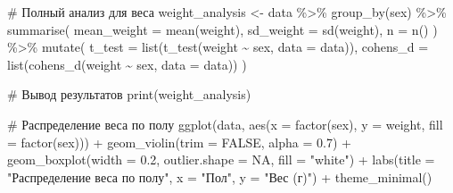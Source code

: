 \documentclass[
  letterpaper,
  DIV=11,
  numbers=noendperiod]{scrreprt}
\newenvironment{Shaded}{\begin{snugshade}}{\end{snugshade}}
\newcommand{\AttributeTok}[1]{\textcolor[rgb]{0.40,0.45,0.13}{#1}}
\newcommand{\CommentTok}[1]{\textcolor[rgb]{0.37,0.37,0.37}{#1}}
\newcommand{\ConstantTok}[1]{\textcolor[rgb]{0.56,0.35,0.01}{#1}}
\newcommand{\FloatTok}[1]{\textcolor[rgb]{0.68,0.00,0.00}{#1}}
\newcommand{\FunctionTok}[1]{\textcolor[rgb]{0.28,0.35,0.67}{#1}}
\newcommand{\NormalTok}[1]{\textcolor[rgb]{0.00,0.23,0.31}{#1}}
\newcommand{\OtherTok}[1]{\textcolor[rgb]{0.00,0.23,0.31}{#1}}
\newcommand{\SpecialCharTok}[1]{\textcolor[rgb]{0.37,0.37,0.37}{#1}}
\newcommand{\StringTok}[1]{\textcolor[rgb]{0.13,0.47,0.30}{#1}}
\begin{document}
\begin{Shaded}
\begin{Highlighting}[]
\CommentTok{\# Полный анализ для веса  }
\NormalTok{weight\_analysis }\OtherTok{\textless{}{-}}\NormalTok{ data }\SpecialCharTok{\%\textgreater{}\%}  
  \FunctionTok{group\_by}\NormalTok{(sex) }\SpecialCharTok{\%\textgreater{}\%}  
  \FunctionTok{summarise}\NormalTok{(  }
    \AttributeTok{mean\_weight =} \FunctionTok{mean}\NormalTok{(weight),  }
    \AttributeTok{sd\_weight =} \FunctionTok{sd}\NormalTok{(weight),  }
    \AttributeTok{n =} \FunctionTok{n}\NormalTok{()  }
\NormalTok{  ) }\SpecialCharTok{\%\textgreater{}\%}  
  \FunctionTok{mutate}\NormalTok{(  }
    \AttributeTok{t\_test =} \FunctionTok{list}\NormalTok{(}\FunctionTok{t\_test}\NormalTok{(weight }\SpecialCharTok{\textasciitilde{}}\NormalTok{ sex, }\AttributeTok{data =}\NormalTok{ data)),  }
    \AttributeTok{cohens\_d =} \FunctionTok{list}\NormalTok{(}\FunctionTok{cohens\_d}\NormalTok{(weight }\SpecialCharTok{\textasciitilde{}}\NormalTok{ sex, }\AttributeTok{data =}\NormalTok{ data))  }
\NormalTok{  )  }

\CommentTok{\# Вывод результатов  }
\FunctionTok{print}\NormalTok{(weight\_analysis) }

\CommentTok{\# Распределение веса по полу}
\FunctionTok{ggplot}\NormalTok{(data, }\FunctionTok{aes}\NormalTok{(}\AttributeTok{x =} \FunctionTok{factor}\NormalTok{(sex), }\AttributeTok{y =}\NormalTok{ weight, }\AttributeTok{fill =} \FunctionTok{factor}\NormalTok{(sex))) }\SpecialCharTok{+}
  \FunctionTok{geom\_violin}\NormalTok{(}\AttributeTok{trim =} \ConstantTok{FALSE}\NormalTok{, }\AttributeTok{alpha =} \FloatTok{0.7}\NormalTok{) }\SpecialCharTok{+}
  \FunctionTok{geom\_boxplot}\NormalTok{(}\AttributeTok{width =} \FloatTok{0.2}\NormalTok{, }\AttributeTok{outlier.shape =} \ConstantTok{NA}\NormalTok{, }\AttributeTok{fill =} \StringTok{"white"}\NormalTok{) }\SpecialCharTok{+}
  \FunctionTok{labs}\NormalTok{(}\AttributeTok{title =} \StringTok{"Распределение веса по полу"}\NormalTok{, }\AttributeTok{x =} \StringTok{"Пол"}\NormalTok{, }\AttributeTok{y =} \StringTok{"Вес (г)"}\NormalTok{) }\SpecialCharTok{+}
  \FunctionTok{theme\_minimal}\NormalTok{()}
\end{Highlighting}
\end{Shaded}
\end{document}
